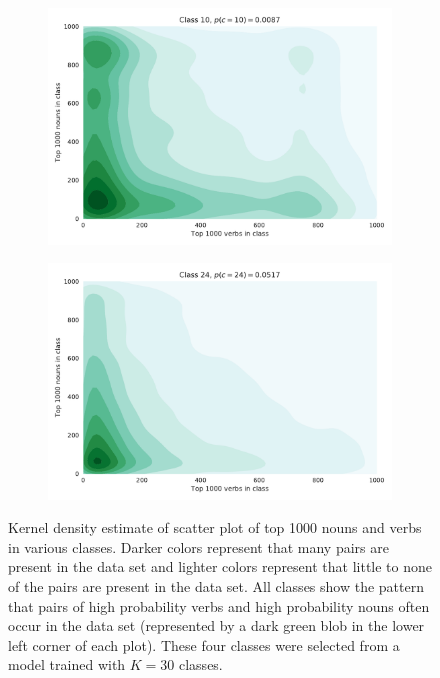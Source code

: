 \documentclass[11pt]{scrartcl}
\begin{document}
\begin{figure}
  \begin{subfigure}[b]{0.5\textwidth}
    \includegraphics[width=\textwidth]{class_10.pdf}
  \end{subfigure}
  \begin{subfigure}[b]{0.5\textwidth}
    \includegraphics[width=\textwidth]{class_24.pdf}
  \end{subfigure}

  \caption{Kernel density estimate of scatter plot of top 1000 nouns
    and verbs in various classes. Darker colors represent that many pairs
    are present in the data set and lighter colors represent that little
    to none of the pairs are present in the data set. All classes show the
    pattern that pairs of high probability verbs and high probability
    nouns often occur in the data set (represented by a dark green blob in
    the lower left corner of each plot). These four classes were
    selected from a model trained with $K=30$ classes.} 
  \label{fig:kde}
\end{figure}
\end{document}

